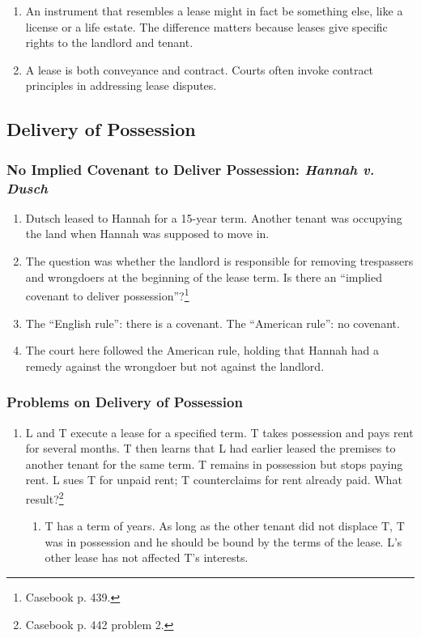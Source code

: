 \begin{enumerate}
    \item An instrument that resembles a lease might in fact be something 
    else, like a license or a life estate. The difference matters because 
    leases give specific rights to the landlord and tenant.
    \item A lease is both conveyance and contract. Courts often invoke 
    contract principles in addressing lease disputes.
\end{enumerate}

\subsection{Delivery of Possession}

\subsubsection{No Implied Covenant to Deliver Possession: \emph{Hannah v. 
Dusch}}

\begin{enumerate}
    \item Dutsch leased to Hannah for a 15-year term. Another tenant was 
    occupying the land when Hannah was supposed to move in.
    \item The question was whether the landlord is responsible for removing 
    trespassers and wrongdoers at the beginning of the lease term. Is there an 
    ``implied covenant to deliver possession''?\footnote{Casebook p. 439.}
    \item The ``English rule'': there is a covenant. The ``American rule'': no 
    covenant.
    \item The court here followed the American rule, holding that Hannah had a 
    remedy against the wrongdoer but not against the landlord.
\end{enumerate}

\subsubsection{Problems on Delivery of Possession}

\begin{enumerate}
    \item L and T execute a lease for a specified term. T takes possession and 
    pays rent for several months. T then learns that L had earlier leased the 
    premises to another tenant for the same term. T remains in possession but 
    stops paying rent. L sues T for unpaid rent; T counterclaims for rent 
    already paid. What result?\footnote{Casebook p. 442 problem 2.}
    \begin{enumerate}
        \item T has a term of years. As long as the other tenant did not 
        displace T, T was in possession and he should be bound by the terms of 
        the lease. L's other lease has not affected T's interests.
    \end{enumerate}
\end{enumerate}

